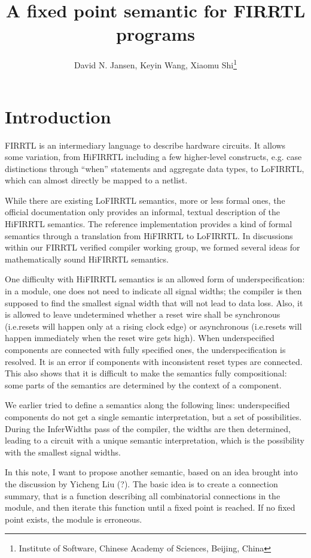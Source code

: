 \documentclass[a4paper]{article}
\title{A fixed point semantic for FIRRTL programs}
\author{David N. Jansen, Keyin Wang, Xiaomu Shi\thanks{Institute of Software, Chinese Academy of Sciences, Beijing, China}}
\begin{document}
\maketitle

\section{Introduction}

FIRRTL is an intermediary language to describe hardware circuits.
It allows some variation, from HiFIRRTL including a few higher-level constructs, e.g. case distinctions through “when” statements and aggregate data types, to LoFIRRTL, which can almost directly be mapped to a netlist.

While there are existing LoFIRRTL semantics, more or less formal ones, the official documentation only provides an informal, textual description of the HiFIRRTL semantics.
The reference implementation provides a kind of formal semantics through a translation from HiFIRRTL to LoFIRRTL.
In discussions within our FIRRTL verified compiler working group, we formed several ideas for mathematically sound HiFIRRTL semantics.

One difficulty with HiFIRRTL semantics is an allowed form of underspecification:
in a module, one does not need to indicate all signal widths;
the compiler is then supposed to find the smallest signal width that will not lead to data loss.
Also, it is allowed to leave undetermined whether a reset wire shall be synchronous (i.e.\@ resets will happen only at a rising clock edge) or asynchronous (i.e.\@ resets will happen immediately when the reset wire gets high).
When underspecified components are connected with fully specified ones, the underspecification is resolved.
It is an error if components with inconsistent reset types are connected.
This also shows that it is difficult to make the semantics fully compositional:
some parts of the semantics are determined by the context of a component.

We earlier tried to define a semantics along the following lines: underspecified components do not get a single semantic interpretation, but a set of possibilities.
During the InferWidths pass of the compiler, the widths are then determined, leading to a circuit with a unique semantic interpretation, which is the possibility with the smallest signal widths.

In this note, I want to propose another semantic, based on an idea brought into the discussion by Yicheng Liu (?).
The basic idea is to create a connection summary, that is a function describing all combinatorial connections in the module,
and then iterate this function until a fixed point is reached.
If no fixed point exists, the module is erroneous.
\end{document}
